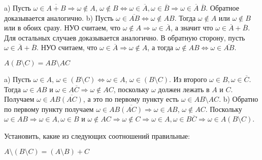 \begin{solution}
a) Пусть $\omega \in \overline{A + B} \Rightarrow \omega \not\in A$, $\omega \not\in B 
\Leftrightarrow \omega \in \overline{A}, \omega \in \overline{B} \Rightarrow \omega \in \overline{A}~
\overline{B}$. Обратное доказывается аналогично. b) Пусть $\omega \in \overline{AB} \Leftrightarrow 
\omega \not\in AB$. Тогда $\omega \not\in A$ или $\omega \not\in B$ или в обоих сразу. НУО считаем, что
$\omega \not\in A \Rightarrow \omega \in \overline{A}$, а значит что $\omega \in \overline{A} + 
\overline{B}$. Для остальных случаев доказывается аналогично. В обратную сторону, пусть $\omega \in
\overline{A} + \overline{B}$. НУО считаем, что $\omega \in \overline{A} \Rightarrow \omega \not\in A$, 
а тогда $\omega \not\in A B \Leftrightarrow \omega \in \overline{AB}$.
\end{solution}


\begin{subtask}{4}
$A \left( B \setminus C \right) = AB \setminus AC$
\end{subtask}

\begin{solution}
a) Пусть $\omega \in A$, $\omega \in \left( B \setminus C \right) \Leftrightarrow \omega
\in A $, $\omega \in \left( B \setminus C \right) $. Из второго $\omega \in B, \omega \in \overline{C}$.
Тогда $\omega \in AB$ и $\omega \in A\overline{C} \Rightarrow \omega \not\in AC$, поскольку
$\omega$ должен лежать в $A$ и $C$. Получаем $\omega \in AB \overline{\left( AC \right)} $, а это по первому пункту 
есть $\omega \in AB \setminus AC$. b) Обратно по первому пункту получаем $\omega \in AB \overline{\left( AC \right)}
 \Rightarrow \omega \in AB$, $\omega \not\in AC$. Поскольку $\omega \in AB \Rightarrow \omega \in A, 
 \omega \in B$ и $\omega \not\in AC \Rightarrow \omega \not\in C \Rightarrow \omega \in A, \omega
\in B\overline{C} \Rightarrow \omega \in A \left( B \setminus C \right)$. 
\end{solution}


\medskip
\begin{task}{2}
  Установить, какие из следующих соотношений правильные:
\end{task}


\begin{subtask}{1}
  $A \setminus \left( B \setminus C \right) = \left( A \setminus B \right) + C$
\end{subtask}

